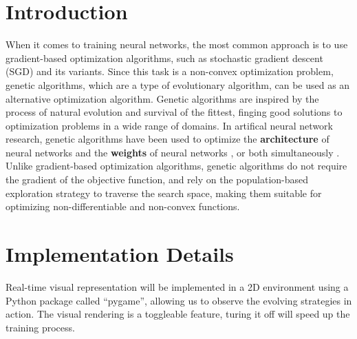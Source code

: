 \documentclass[sigconf]{acmart}
\begin{document}
\section{Introduction}
When it comes to training neural networks, the most common approach is to use gradient-based optimization algorithms, such as stochastic gradient descent (SGD) and its variants. Since this task is a non-convex optimization problem, genetic algorithms, which are a type of evolutionary algorithm, can be used as an alternative optimization algorithm. Genetic algorithms are inspired by the process of natural evolution and survival of the fittest, finging good solutions to optimization problems in a wide range of domains.
In artifical neural network research, genetic algorithms have been used to optimize the \textbf{architecture} of neural networks \cite{wu2021trainingNI} and the \textbf{weights} of neural networks \cite{NN_GA_DavidJ_10.5555/1623755.1623876}, or both simultaneously \cite{stanley2002evolving,NDE_Karl_10.1145/3067695.3075967}. Unlike gradient-based optimization algorithms, genetic algorithms do not require the gradient of the objective function, and rely on the population-based exploration strategy to traverse the search space, making them suitable for optimizing non-differentiable and non-convex functions. 

\section{Implementation Details}
Real-time visual representation will be implemented in a 2D environment using a Python package called ``pygame'', allowing us to observe the evolving strategies in action. The visual rendering is a toggleable feature, turing it off will speed up the training process. 
\end{document}

